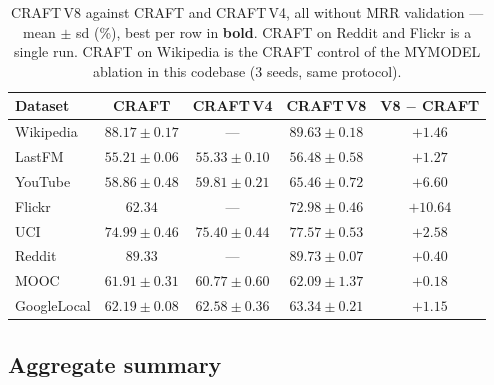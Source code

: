 \documentclass[11pt]{article}
\begin{document}
\begin{table}[H]
\centering
\caption{CRAFT\,V8 against CRAFT and CRAFT\,V4, all without MRR validation --- mean $\pm$ sd (\%),
best per row in \textbf{bold}. CRAFT on Reddit and Flickr is a single run. CRAFT on
Wikipedia is the CRAFT control of the MYMODEL ablation in this codebase (3 seeds, same protocol).}
\begin{tabular}{lcccc}
\toprule
Dataset & CRAFT & CRAFT\,V4 & CRAFT\,V8 & V8 $-$ CRAFT \\
\midrule
Wikipedia   & $88.17 \pm 0.17$ & ---              & $\mathbf{89.63 \pm 0.18}$ & $+1.46$ \\
LastFM      & $55.21 \pm 0.06$ & $55.33 \pm 0.10$ & $\mathbf{56.48 \pm 0.58}$ & $+1.27$ \\
YouTube     & $58.86 \pm 0.48$ & $59.81 \pm 0.21$ & $\mathbf{65.46 \pm 0.72}$ & $+6.60$ \\
Flickr      & $62.34$          & ---              & $\mathbf{72.98 \pm 0.46}$ & $+10.64$ \\
UCI         & $74.99 \pm 0.46$ & $75.40 \pm 0.44$ & $\mathbf{77.57 \pm 0.53}$ & $+2.58$ \\
Reddit      & $89.33$          & ---              & $\mathbf{89.73 \pm 0.07}$ & $+0.40$ \\
MOOC        & $61.91 \pm 0.31$ & $60.77 \pm 0.60$ & $\mathbf{62.09 \pm 1.37}$ & $+0.18$ \\
GoogleLocal & $62.19 \pm 0.08$ & $62.58 \pm 0.36$ & $\mathbf{63.34 \pm 0.21}$ & $+1.15$ \\
\bottomrule
\end{tabular}
\end{table}

\FloatBarrier

\subsection{Aggregate summary}
\end{document}
